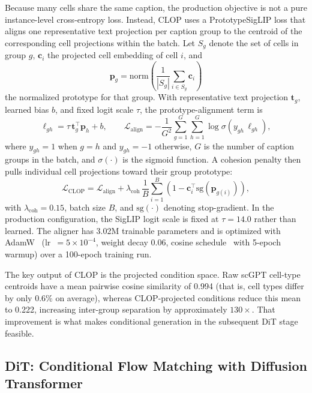 \documentclass[fleqn,10pt,lineno]{wlpeerj}
\begin{document}
Because many cells share the same caption, the production objective is not a pure instance-level cross-entropy loss. Instead, CLOP uses a PrototypeSigLIP loss that aligns one representative text projection per caption group to the centroid of the corresponding cell projections within the batch. Let $S_g$ denote the set of cells in group $g$, $\mathbf{c}_i$ the projected cell embedding of cell $i$, and
\begin{equation}
\mathbf{p}_g = \mathrm{norm}\!\left(\frac{1}{|S_g|}\sum_{i \in S_g} \mathbf{c}_i\right)
\end{equation}
the normalized prototype for that group. With representative text projection $\mathbf{t}_g$, learned bias $b$, and fixed logit scale $\tau$, the prototype-alignment term is
\begin{equation}
\ell_{gh} = \tau\,\mathbf{t}_g^\top \mathbf{p}_h + b, \qquad
\mathcal{L}_\text{align} = -\frac{1}{G^2}\sum_{g=1}^{G}\sum_{h=1}^{G}\log\sigma\!\left(y_{gh}\,\ell_{gh}\right),
\label{eq:clop}
\end{equation}
where $y_{gh}=1$ when $g=h$ and $y_{gh}=-1$ otherwise, $G$ is the number of caption groups in the batch, and $\sigma(\cdot)$ is the sigmoid function. A cohesion penalty then pulls individual cell projections toward their group prototype:
\begin{equation}
\mathcal{L}_\text{CLOP} = \mathcal{L}_\text{align} + \lambda_\text{coh}\,\frac{1}{B}\sum_{i=1}^{B}\left(1 - \mathbf{c}_i^\top \mathrm{sg}(\mathbf{p}_{g(i)})\right),
\end{equation}
with $\lambda_\text{coh}=0.15$, batch size $B$, and $\mathrm{sg}(\cdot)$ denoting stop-gradient. In the production configuration, the SigLIP logit scale is fixed at $\tau = 14.0$ rather than learned. The aligner has 3.02M trainable parameters and is optimized with AdamW~\citep{ref-adamw} (lr~$= 5 \times 10^{-4}$, weight decay 0.06, cosine schedule~\citep{ref-cosine-schedule} with 5-epoch warmup) over a 100-epoch training run.

The key output of CLOP is the projected condition space. Raw scGPT cell-type centroids have a mean pairwise cosine similarity of 0.994 (that is, cell types differ by only 0.6\% on average), whereas CLOP-projected conditions reduce this mean to 0.222, increasing inter-group separation by approximately $130\times$. That improvement is what makes conditional generation in the subsequent DiT stage feasible.

\subsection*{DiT: Conditional Flow Matching with Diffusion Transformer}\label{sec:dit}
\end{document}
